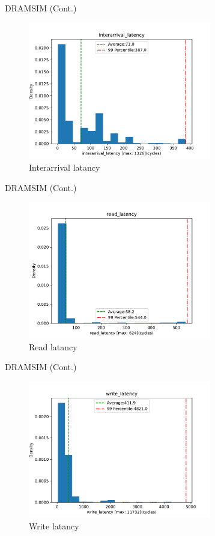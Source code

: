 \documentclass{beamer}
\begin{document}
\begin{frame}{DRAMSIM (Cont.)}
	\begin{figure}
		\centering
		\includegraphics[height=6cm]{images/img13}
		\caption{Interarrival latancy}
		\label{fig:Interarrival latancy}
	\end{figure}	
\end{frame}



\begin{frame}{DRAMSIM (Cont.)}
	\begin{figure}
		\centering
		\includegraphics[height=6cm]{images/img14}
		\caption{Read latancy}
		\label{fig:Read latancy}
	\end{figure}	
\end{frame}


\begin{frame}{DRAMSIM (Cont.)}
	\begin{figure}
		\centering
		\includegraphics[height=6cm]{images/img15}
		\caption{Write latancy}
		\label{fig:Write latancy}
	\end{figure}	
\end{frame}
\end{document}
